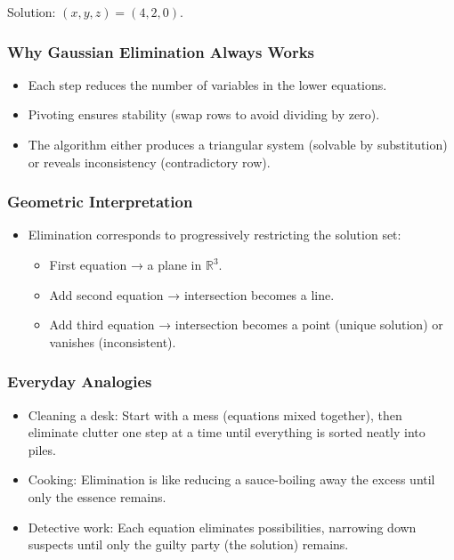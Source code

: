 \documentclass[
  letterpaper,
  DIV=11,
  numbers=noendperiod]{scrreprt}
\providecommand{\tightlist}{%
  \setlength{\itemsep}{0pt}\setlength{\parskip}{0pt}}
\begin{document}
Solution: \((x, y, z) = (4, 2, 0)\).

\subsubsection{Why Gaussian Elimination Always
Works}\label{why-gaussian-elimination-always-works}

\begin{itemize}
\tightlist
\item
  Each step reduces the number of variables in the lower equations.
\item
  Pivoting ensures stability (swap rows to avoid dividing by zero).
\item
  The algorithm either produces a triangular system (solvable by
  substitution) or reveals inconsistency (contradictory row).
\end{itemize}

\subsubsection{Geometric
Interpretation}\label{geometric-interpretation-1}

\begin{itemize}
\item
  Elimination corresponds to progressively restricting the solution set:

  \begin{itemize}
  \tightlist
  \item
    First equation → a plane in \(\mathbb{R}^3\).
  \item
    Add second equation → intersection becomes a line.
  \item
    Add third equation → intersection becomes a point (unique solution)
    or vanishes (inconsistent).
  \end{itemize}
\end{itemize}

\subsubsection{Everyday Analogies}\label{everyday-analogies-23}

\begin{itemize}
\tightlist
\item
  Cleaning a desk: Start with a mess (equations mixed together), then
  eliminate clutter one step at a time until everything is sorted neatly
  into piles.
\item
  Cooking: Elimination is like reducing a sauce-boiling away the excess
  until only the essence remains.
\item
  Detective work: Each equation eliminates possibilities, narrowing down
  suspects until only the guilty party (the solution) remains.
\end{itemize}
\end{document}
